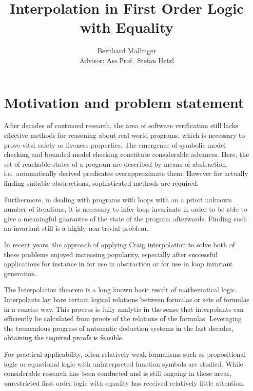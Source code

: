 \documentclass[,%
			paper=a4,%
			DIV11, %
			liststotoc,
			bibtotoc,
			draft=false,%
			numbers=noendperiod
			]{scrartcl}
\title{Interpolation in First Order Logic with Equality}
\author{Bernhard Mallinger\medskip \\
Advisor: Ass.Prof.\ Stefan Hetzl}
\theoremstyle{definition}
\begin{document}
\maketitle

\section{Motivation and problem statement}
\label{motivation}

After decades of continued research, the area of software verification still lacks effective methods for reasoning about real world programs, which is necessary to prove vital safety or liveness properties.
The emergence of symbolic model checking and bounded model checking constitute considerable advances.
Here, the set of reachable states of a program are described by means of abstraction, i.e.\ automatically derived predicates overapproximate them.
However for actually finding suitable abstractions, sophisticated methods are required.

Furthermore, in dealing with programs with loops with an a priori unknown number of iterations, it is necessary to infer loop invariants in order to be able to give a meaningful guarantee of the state of the program afterwards. Finding such an invariant still is a highly non-trivial problem.

In recent years, the approach of applying Craig interpolation to solve both of these problems enjoyed increasing popularity, especially after successful applications for instance in \cite{McMillan03} for use in abstraction or \cite{weissenbacher2010} for use in loop invariant generation.

The Interpolation theorem is a long known basic result of mathematical logic.
Interpolants lay bare certain logical relations between formulas or sets of formulas in a concise way. 
This process is fully analytic in the sense that interpolants can efficiently be calculated from proofs of the relations of the formulas.
Leveraging the tremendous progress of automatic deduction systems in the last decades, obtaining the required proofs is feasible.

For practical applicability, often relatively weak formalisms such as propositional logic or equational logic with uninterpreted function symbols are studied. 
While considerable research has been conducted and is still ongoing in these areas, unrestricted first order logic with equality has received relatively little attention. 


\end{document}
